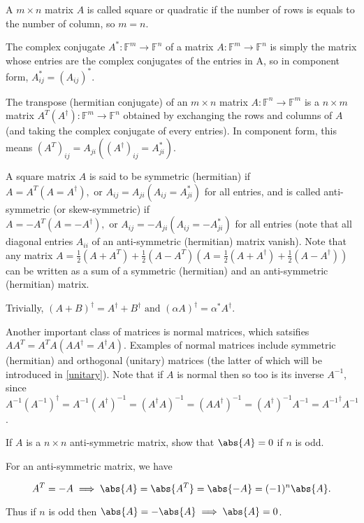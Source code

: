 \documentclass[a4paper,12pt]{report}
\begin{document}
A \(m\times n\) matrix \(A\) is called square or quadratic if the number of rows is equals to the number of column, so \(m = n\). 

The complex conjugate \(A^{*} : \mathbb{F}^{m} \rightarrow \mathbb{F}^{n}   \) of a matrix \(A: \mathbb{F}^{m}\rightarrow \mathbb{F}^{n}  \) is simply the matrix whose entries are the complex conjugates of the entries in A, so in component form, \(A^{*}_{ij} = (A_{ij} )^{*}\).

The transpose (hermitian conjugate) of an \(m \times n\) matrix \(A: \mathbb{F}^{n} \rightarrow \mathbb{F}^{m}   \) is a \(n \times m\) matrix \(A^{T} (A^{\dagger} ): \mathbb{F}^{m} \rightarrow \mathbb{F}^{n}   \) obtained by exchanging the rows and columns of \(A\) (and taking the complex conjugate of every entries). In component form, this means \((A^{T} )_{ij}  = A_{ji} ((A^{\dagger} )_{ij} = A^*_{ji} )\). 

A square matrix \(A\) is said to be symmetric (hermitian) if \(A = A^{T} (A = A^{\dagger} ), \text { or } A_{ij} = A_{ji}  (A_{ij} = A^*_{ji}) \) for all entries, and is called anti-symmetric (or skew-symmetric) if \(A = -A^{T} (A = -A^{\dagger} ), \text { or } A_{ij} = -A_{ji} (A_{ij} = - A^*_{ji}  )  \) for all entries (note that all diagonal entries \(A_{ii} \) of an anti-symmetric (hermitian) matrix vanish). Note that any matrix \(A = \frac{1}{2}(A + A^T) + \frac{1}{2}(A - A^T) (A = \frac{1}{2}(A + A^{\dagger} ) + \frac{1}{2}(A - A^{\dagger} )) \) can be written as a sum of a symmetric (hermitian) and an anti-symmetric (hermitian) matrix. 

Trivially, \((A+B)^{\dagger} = A^{\dagger} + B^{\dagger} \text { and } (\alpha A)^{\dagger} = \alpha ^{*} A^{\dagger}\). 

Another important class of matrices is normal matrices, which satsifies \(AA^T = A^TA (AA^{\dagger} = A^{\dagger} A)\). Examples of normal matrices include symmetric (hermitian) and orthogonal (unitary) matrices (the latter of which will be introduced in \cref{unitary}). Note that if \(A\) is normal then so too is its inverse \(A^{-1} \), since \(A^{-1} (A^{-1} )^{\dagger} = A^{-1} (A^{\dagger} )^{-1} = (A^{\dagger} A)^{-1} = (A A^{\dagger} )^{-1} = (A^{\dagger} )^{-1} A^{-1} = {A^{-1} }^{\dagger} A^{-1}\).  

{If \(A\) is a \(n \times  n\) anti-symmetric matrix, show that \(\abs{A} = 0\) if \(n\) is odd.}
{For an anti-symmetric matrix, we have

\begin{equation}
    A^T = - A \implies \abs{A} = \abs{A^T} = \abs{-A} = (-1)^{n}\abs{A}.    
\end{equation}

Thus if \(n\) is odd then \(\abs{A} = -\abs{A} \implies \abs{A} =0  \).

} 
\end{document}
